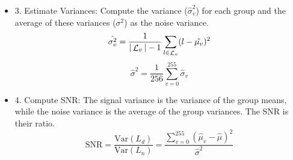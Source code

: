 \begin{frame}
    \begin{block}{}
        \begin{itemize}
            \item 3. Estimate Variances: Compute the variance ($\hat{\sigma}_v^2$) for each group and the average of these variances ($\sigma^2$) as the noise variance.
            $$\hat{\sigma_v^2} = \frac{1}{|\mathop{\mathcal{L}}_v|-1}\sum_{l \in \mathop{\mathcal{L}}_v} (l-\hat{\mu_v})^2$$
            $$\hat{\sigma}^2=\frac{1}{256}\sum_{v=0}^{255}\hat{\sigma}_v$$
            \item 4. Compute SNR: The signal variance is the variance of the group means, while the noise variance is the average of the group variances. The SNR is their ratio.
                $$
                \text{SNR} = \frac{\text{Var}(L_d)}{\text{Var}(L_n)} = \frac{\sum_{v=0}^{255}(\hat{\mu}_v - \hat{\mu})^2}{\hat{\sigma}^2}
                $$
        \end{itemize}
    \end{block}
\end{frame}




